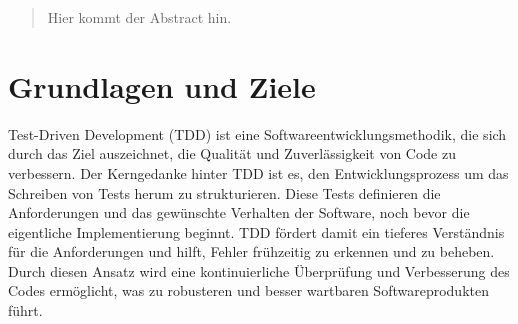 \documentclass[a0,landscape]{a0poster}
\begin{document}
\vspace{1cm} %


\begin{multicols}{4} %


\color{Navy} %

\begin{abstract}

Hier kommt der Abstract hin.

\end{abstract}








\color{DarkSlateGray} %

\section*{Grundlagen und Ziele}

Test-Driven Development (TDD) ist eine Softwareentwicklungsmethodik, die sich durch das Ziel auszeichnet, die Qualität und Zuverlässigkeit von Code zu verbessern. Der Kerngedanke hinter TDD ist es, den Entwicklungsprozess um das Schreiben von Tests herum zu strukturieren. Diese Tests definieren die Anforderungen und das gewünschte Verhalten der Software, noch bevor die eigentliche Implementierung beginnt. TDD fördert damit ein tieferes Verständnis für die Anforderungen und hilft, Fehler frühzeitig zu erkennen und zu beheben. Durch diesen Ansatz wird eine kontinuierliche Überprüfung und Verbesserung des Codes ermöglicht, was zu robusteren und besser wartbaren Softwareprodukten führt. \cite{ieee_tdd_2007}


\end{multicols}
\end{document}
